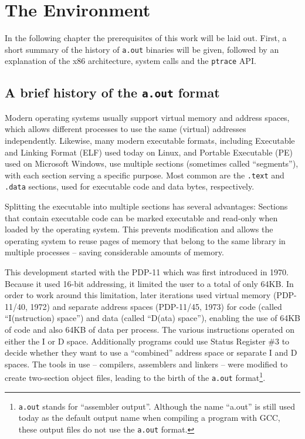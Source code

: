 \documentclass[draft,final]{vutinfth} %
\begin{document}
\chapter{The Environment}
\label{environment}

In the following chapter the prerequisites of this work will be laid out. First, a short summary of the history of \texttt{a.out} binaries will be given, followed by an explanation of the x86 architecture, system calls and the \texttt{ptrace} API.

\section{A brief history of the \texttt{a.out} format}
\label{history}

Modern operating systems usually support virtual memory and address spaces, which allows different processes to use the same (virtual) addresses independently. Likewise, many modern executable formats, including Executable and Linking Format (ELF)\cite{ElfManPage} used today on Linux, and Portable Executable (PE) used on Microsoft Windows, use multiple sections (sometimes called ``segments''), with each section serving a specific purpose. Most common are the \texttt{.text} and \texttt{.data} sections, used for executable code and data bytes, respectively.

Splitting the executable into multiple sections has several advantages\cite[page 50]{Levine}: Sections that contain executable code can be marked executable and read-only when loaded by the operating system. This prevents modification and allows the operating system to reuse pages of memory that belong to the same library in multiple processes -- saving considerable amounts of memory.

This development started with the PDP-11 which was first introduced in 1970. Because it used 16-bit addressing, it limited the user to a total of only 64KB. In order to work around this limitation, later iterations used virtual memory (PDP-11/40, 1972\cite[page 6-2]{PDP1140Handbook}) and separate address spaces (PDP-11/45, 1973) for code (called ``I(nstruction) space'') and data (called ``D(ata) space'')\cite[page 145]{PDP1145Handbook}, enabling the use of 64KB of code and also 64KB of data per process. The various instructions operated on either the I or D space. Additionally programs could use Status Register \#3 to decide whether they want to use a ``combined'' address space or separate I and D spaces. The tools in use  -- compilers, assemblers and linkers -- were modified to create two-section object files, leading to the birth of the \texttt{a.out} format\footnote{\texttt{a.out} stands for ``assembler output''. Although the name ``a.out'' is still used today as the default output name when compiling a program with GCC, these output files do not use the \texttt{a.out} format.\cite{RitchieCLangDev}}.
\end{document}
